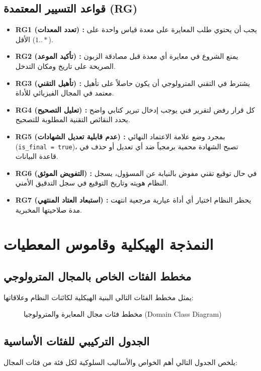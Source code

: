 \documentclass{bts-report-ar}
\begin{document}
\subsection{قواعد التسيير المعتمدة (RG)}
\begin{itemize}
  \item \textbf{RG1 (تعدد المعدات) :} يجب أن يحتوي طلب المعايرة على معدة قياس واحدة على الأقل ($1..*$).
  \item \textbf{RG2 (تأكيد الموعد) :} يمنع الشروع في معايرة أي معدة قبل مصادقة الزبون الصريحة على تاريخ ومكان التدخل.
  \item \textbf{RG3 (تأهيل التقني) :} يشترط في التقني المترولوجي أن يكون حاصلاً على تأهيل معتمد في المجال الفيزيائي للأداة.
  \item \textbf{RG4 (تعليل التصحيح) :} كل قرار رفض لتقرير فني يوجب إدخال تبرير كتابي واضح يحدد النقائص التقنية المطلوبة للتصحيح.
  \item \textbf{RG5 (عدم قابلية تعديل الشهادات) :} بمجرد وضع علامة الاعتماد النهائي (\texttt{is\_final = true})، تصبح الشهادة محمية برمجياً ضد أي تعديل أو حذف في قاعدة البيانات.
  \item \textbf{RG6 (التفويض الموثق) :} في حال توقيع تقني مفوض بالنيابة عن المسؤول، يسجل النظام هويته وتاريخ التوقيع في سجل التدقيق الأمني.
  \item \textbf{RG7 (استبعاد العتاد المنتهي) :} يحظر النظام اختيار أي أداة عيارية مرجعية انتهت مدة صلاحيتها المخبرية.
\end{itemize}

\section{النمذجة الهيكلية وقاموس المعطيات}
\subsection{مخطط الفئات الخاص بالمجال المترولوجي}
يمثل مخطط الفئات التالي البنية الهيكلية لكائنات النظام وعلاقاتها:

\begin{figure}[H]
  \centering
  \begin{LTR}
  
  \end{LTR}
  \caption{مخطط فئات مجال المعايرة والمترولوجيا (Domain Class Diagram)}
  \label{fig:class-domain}
\end{figure}

\subsection{الجدول التركيبي للفئات الأساسية}
يلخص الجدول التالي أهم الخواص والأساليب السلوكية لكل فئة من فئات المجال:
\end{document}
